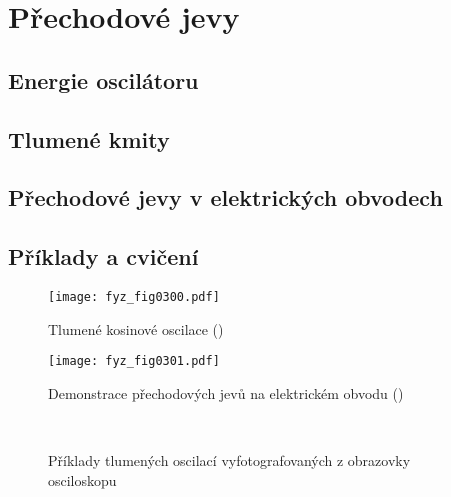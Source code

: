\setchaptertoc
\chapter{Přechodové jevy}\label{fyz:IchapXXIV}

  \section{Energie oscilátoru}\label{fyz:IchapXXIVsecI}
  \section{Tlumené kmity}\label{fyz:IchapXXIVsecII}
  \section{Přechodové jevy v elektrických obvodech}\label{fyz:IchapXXVIVsecIII}
  \section{Příklady a cvičení}\label{fyz:IchapXXIVsecIV}

    \begin{figure}[ht!] %
      \centering
      \texttt{[image: fyz\_fig0300.pdf]}
      \caption{Tlumené kosinové oscilace 
               (\cite[s.~326]{Feynman01})}
      \label{fyz:fig0300}
    \end{figure}

    \begin{figure}[ht!] %
      \centering
      \texttt{[image: fyz\_fig0301.pdf]}
      \caption{Demonstrace přechodových jevů na elektrickém obvodu 
               (\cite[s.~328]{Feynman01})}
      \label{fyz:fig0301}
    \end{figure}
    

    \begin{figure}[ht!]      %
      \centering
               \\
      \caption{Příklady tlumených oscilací vyfotografovaných z obrazovky osciloskopu
               \cite[s.~329]{Feynman01}}
      \label{fyz:fig0302}
    \end{figure}

